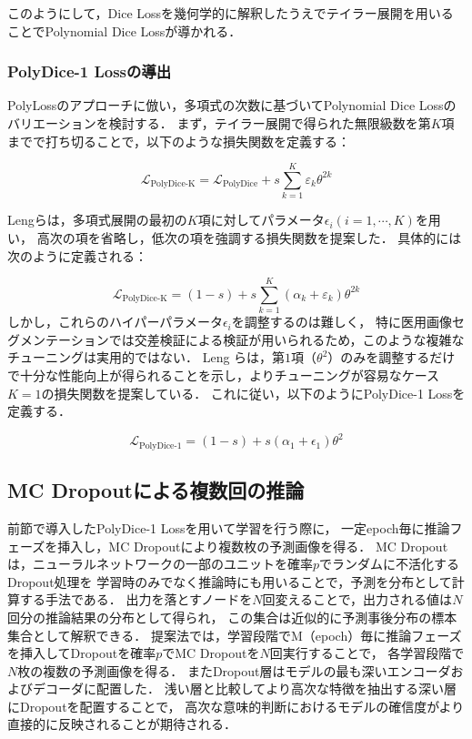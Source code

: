 \documentclass[10pt, a4paper, twocolumn]{jarticle}
\begin{document}
このようにして，Dice Lossを幾何学的に解釈したうえでテイラー展開を用いることでPolynomial Dice Lossが導かれる．


\subsubsection{PolyDice-1 Lossの導出}
PolyLoss\cite{leng2022polyloss}のアプローチに倣い，多項式の次数に基づいてPolynomial Dice Lossのバリエーションを検討する．
まず，テイラー展開で得られた無限級数を第$K$項までで打ち切ることで，以下のような損失関数を定義する：

\begin{equation}
  \mathcal{L}_{\text{PolyDice-K}} = \mathcal{L}_{\text{PolyDice}} + s \sum_{k=1}^{K} \varepsilon_k \theta^{2k}
\end{equation}

Lengら\cite{leng2022polyloss}は，多項式展開の最初の$K$項に対してパラメータ$\epsilon_i(i = 1, \cdots, K)$を用い，
高次の項を省略し，低次の項を強調する損失関数を提案した．
具体的には次のように定義される：

\begin{equation}
  \mathcal{L}_{\text{PolyDice-K}} = (1 - s) + s \sum_{k=1}^{K} (\alpha_k + \varepsilon_k) \theta^{2k}
\end{equation}
%
%
しかし，これらのハイパーパラメータ$\epsilon_i$を調整するのは難しく，
特に医用画像セグメンテーションでは交差検証による検証が用いられるため，このような複雑なチューニングは実用的ではない．
Leng ら\cite{leng2022polyloss}は，第$1$項（$\theta ^ 2$）のみを調整するだけで十分な性能向上が得られることを示し，よりチューニングが容易なケース$K=1$の損失関数を提案している．
これに従い，以下のようにPolyDice-1 Lossを定義する．

\begin{equation}
  \mathcal{L}_{\text{PolyDice-1}} = (1 - s) + s(\alpha_1 + \epsilon_1) \theta^2
\end{equation}

\subsection{MC Dropoutによる複数回の推論}

前節で導入したPolyDice-1 Lossを用いて学習を行う際に，
一定epoch毎に推論フェーズを挿入し，MC Dropoutにより複数枚の予測画像を得る．
MC Dropoutは，ニューラルネットワークの一部のユニットを確率$p$でランダムに不活化するDropout処理を
学習時のみでなく推論時にも用いることで，予測を分布として計算する手法である．
出力を落とすノードを$N$回変えることで，出力される値は$N$回分の推論結果の分布として得られ，
この集合は近似的に予測事後分布の標本集合として解釈できる．
提案法では，学習段階でM（epoch）毎に推論フェーズを挿入してDropoutを確率$p$でMC Dropoutを$N$回実行することで，
各学習段階で$N$枚の複数の予測画像を得る．
またDropout層はモデルの最も深いエンコーダおよびデコーダに配置した．
浅い層と比較してより高次な特徴を抽出する深い層にDropoutを配置することで，
高次な意味的判断におけるモデルの確信度がより直接的に反映されることが期待される．
\end{document}
